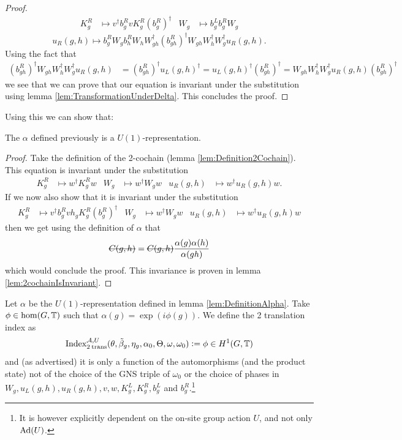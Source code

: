 \documentclass[11pt,a4paper,twoside]{article}
\numberwithin{equation}{section}
\begin{document}
\begin{proof}
		\begin{align}
			K_g^R&\mapsto v^\dagger b_g^R v K_g^R (b_g^R)^\dagger&W_g&\mapsto b_g^Lb_g^RW_g
		\end{align}
		\begin{equation*}
			u_R(g,h)\mapsto b_g^R W_g b_h^R W_h W_{gh}^\dagger (b_{gh}^R)^\dagger W_{gh}W_h^\dagger W_g^\dagger u_R(g,h).
		\end{equation*}
		Using the fact that
		\begin{align}
			(b_{gh}^R)^\dagger W_{gh}W_h^\dagger W_g^\dagger u_R(g,h)&=(b_{gh}^R)^\dagger u_L(g,h)^\dagger=u_L(g,h)^\dagger(b_{gh}^R)^\dagger=W_{gh}W_h^\dagger W_g^\dagger u_R(g,h) (b_{gh}^R)^\dagger
		\end{align}
		we see that we can prove that our equation is invariant under the substitution using lemma \ref{lem:TransformationUnderDelta}. This concludes the proof.
	\end{proof}
	Using this we can show that:
	\begin{lemma}
		The $\alpha$ defined previously is a $U(1)$-representation.
	\end{lemma}
	\begin{proof}
		Take the definition of the 2-cochain (lemma \ref{lem:Definition2Cochain}). This equation is invariant under the substitution
		\begin{align}
			K_g^R&\mapsto w^\dagger K_g^R w&W_g&\mapsto w^\dagger W_g w&u_R(g,h)&\mapsto w^\dagger u_R(g,h)w.
		\end{align}
		If we now also show that it is invariant under the substitution
		\begin{align}
			K_g^R&\mapsto v^\dagger b_g^R v h_g K_g^R (b_g^R)^\dagger&W_g&\mapsto w^\dagger W_g w&u_R(g,h)&\mapsto w^\dagger u_R(g,h)w
		\end{align}
		then we get using the definition of $\alpha$ that
		\begin{equation}
			\stkout{C(g,h)}=\stkout{C(g,h)}\frac{\alpha(g)\alpha(h)}{\alpha(gh)}
		\end{equation}
		which would conclude the proof. This invariance is proven in lemma \ref{lem:2cochainIsInvariant}.
	\end{proof}
	\begin{definition}\label{def:DefinitionOfTheH1ValuedIndex}
		Let $\alpha$ be the $U(1)$-representation defined in lemma \ref{lem:DefinitionAlpha}. Take $\phi\in\hom(G,\mathbb T)$ such that $\alpha(g)=\exp(i\phi(g))$. We define the 2 translation index as
		\begin{equation}
			\textrm{Index}_{2\:\text{trans}}^{\mathcal A,U}(\theta,\tilde{\beta}_g,\eta_g,\alpha_0,\Theta,\omega,\omega_0)\vcentcolon= \phi\in H^1(G,\mathbb T)
		\end{equation}
		and (as advertised) it is only a function of the automorphisms (and the product state) not of the choice of the GNS triple of $\omega_0$ or the choice of phases in $W_g,u_L(g,h),u_R(g,h),v,w,K^L_g,K^R_g,b^L_g$ and $b^R_g$.\footnote{It is however explicitly dependent on the on-site group action $U$, and not only $\Ad{U}$.}
	\end{definition}
\end{document}
